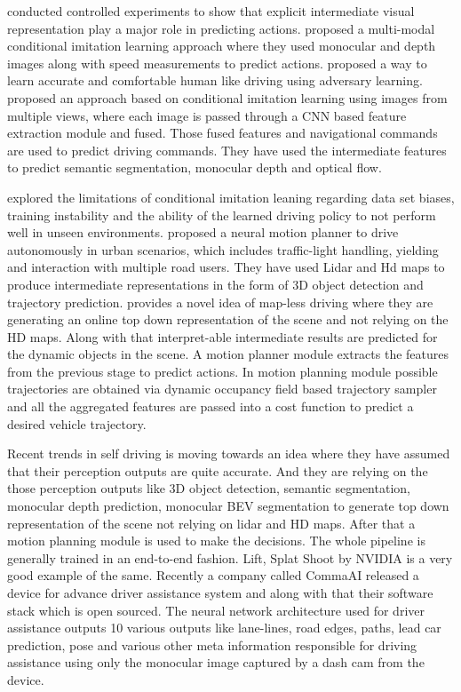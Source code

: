 \cite{DBLP:journals/corr/abs-1905-12887} conducted controlled experiments to show that explicit intermediate visual representation play a major role in predicting actions. \cite{DBLP:journals/corr/abs-1906-03199} proposed a multi-modal conditional imitation learning approach where they used monocular and depth images along with speed measurements to predict actions. \cite{DBLP:journals/corr/abs-1903-10995} proposed a way to learn accurate and comfortable human like driving  using adversary learning. \cite{DBLP:journals/corr/abs-1912-00177} proposed an approach based on conditional imitation learning using images from multiple views, where each image is passed through a CNN based feature extraction module and fused. Those fused features and navigational commands are used to predict driving commands. They have used the intermediate features to predict semantic segmentation, monocular depth and optical flow. 


\cite{DBLP:journals/corr/abs-1904-08980} explored the limitations of conditional imitation leaning regarding data set biases, training instability and the ability of the learned driving policy to not perform well in unseen environments. \cite{DBLP:journals/corr/abs-2101-06679} proposed a neural motion planner to drive autonomously in urban scenarios, which includes traffic-light handling, yielding and interaction with multiple road users. They have used Lidar and Hd maps to produce intermediate representations in the form of 3D object detection and trajectory prediction. \cite{Casas_2021_CVPR} provides a novel idea of map-less driving where they are generating an online top down representation of the scene and not relying on the HD maps. Along with that interpret-able intermediate results are predicted for the dynamic objects in the scene. A motion planner module extracts the features from the previous stage to predict actions. In motion planning module possible trajectories are obtained via dynamic occupancy field based trajectory sampler and all the aggregated features are passed into a cost function to predict a desired vehicle trajectory. 

Recent trends in self driving is moving towards an idea where they have assumed that their perception outputs are quite accurate. And they are relying on the those perception outputs like 3D object detection, semantic segmentation, monocular depth prediction, monocular BEV segmentation to generate top down representation of the scene not relying on lidar and HD maps. After that a motion planning module is used to make the decisions. The whole pipeline is generally trained in an end-to-end fashion. Lift, Splat Shoot \cite{DBLP:journals/corr/abs-2008-05711} by NVIDIA is a very good example of the same. Recently a company called CommaAI released a device for advance driver assistance system and along with that their software stack which is open sourced. The neural network architecture used for driver assistance outputs 10 various outputs like lane-lines, road edges, paths, lead car prediction, pose and various other meta information responsible for driving assistance using only the monocular image captured by a dash cam from the device. 

